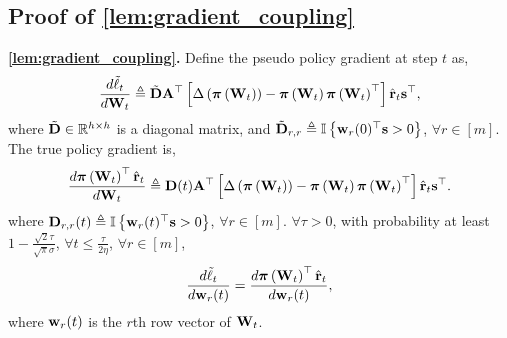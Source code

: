 \subsection{Proof of \cref{lem:gradient_coupling}}

{\bf \cref{lem:gradient_coupling}.} Define the pseudo policy gradient at step $t$ as,
\begin{equation*}
\begin{split}
	\frac{d \tilde{\ell}_t}{d {\mathbf{W}}_t} \triangleq \tilde{{\mathbf{D}}} {\mathbf{A}}^\top \left[ \Delta\left( {\boldsymbol{\pi}}\left({\mathbf{W}}_t\right) \right) - {\boldsymbol{\pi}}\left({\mathbf{W}}_t\right) {\boldsymbol{\pi}}\left({\mathbf{W}}_t\right)^\top \right] \hat{{\mathbf{r}}}_t {\mathbf{s}}^\top,
\end{split}
\end{equation*}
where $\tilde{{\mathbf{D}}} \in {\mathbb{R}}^{h \times h}$ is a diagonal matrix, and $\tilde{{\mathbf{D}}}_{r,r} \triangleq {\mathbb{I}}\left\{ {\mathbf{w}}_r(0)^\top {\mathbf{s}} > 0 \right\}$, $\forall r \in [m]$. The true policy gradient is,
\begin{equation*}
\begin{split}
    \frac{d {\boldsymbol{\pi}}\left({\mathbf{W}}_t\right)^\top \hat{{\mathbf{r}}}_t}{d {\mathbf{W}}_t} \triangleq  {\mathbf{D}}(t) {\mathbf{A}}^\top \left[ \Delta\left( {\boldsymbol{\pi}}\left({\mathbf{W}}_t\right) \right) - {\boldsymbol{\pi}}\left({\mathbf{W}}_t\right) {\boldsymbol{\pi}}\left({\mathbf{W}}_t\right)^\top \right] \hat{{\mathbf{r}}}_t {\mathbf{s}}^\top.
\end{split}
\end{equation*}
where ${\mathbf{D}}_{r,r}(t) \triangleq {\mathbb{I}}\left\{ {\mathbf{w}}_r(t)^\top {\mathbf{s}} > 0 \right\}$, $\forall r \in [m]$. $\forall \tau > 0$, with probability at least $1 - \frac{\sqrt{2}\tau}{\sqrt{\pi}\sigma}$, $\forall t \le \frac{\tau}{ 2 \eta }$, $\forall r \in [m]$,
\begin{equation*}
	\frac{d\tilde{\ell}_t}{d {\mathbf{w}}_r(t)} = \frac{d {\boldsymbol{\pi}}\left({\mathbf{W}}_t\right)^\top \hat{{\mathbf{r}}}_t}{d {\mathbf{w}}_r(t)},
\end{equation*}
where ${\mathbf{w}}_r(t)$ is the $r$th row vector of ${\mathbf{W}}_t$.
